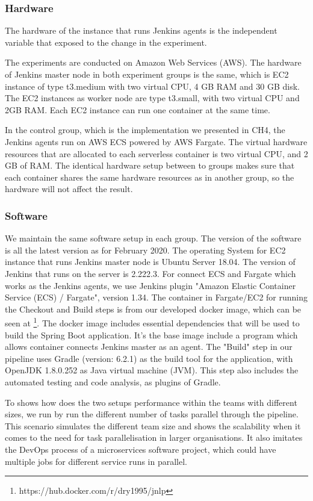 \subsubsection{Hardware}
The hardware of the instance that runs Jenkins agents is the independent variable that exposed to the change in the experiment.
\par
The experiments are conducted on Amazon Web Services (AWS). The hardware of Jenkins master node in both experiment groups is the same, which is EC2 instance of type t3.medium with two virtual CPU, 4 GB RAM and 30 GB disk. The EC2 instances as worker node are type t3.small, with two virtual CPU and 2GB RAM. Each EC2 instance can run one container at the same time.
\par
In the control group, which is the implementation we presented in CH4, the Jenkins agents run on AWS ECS powered by AWS Fargate. The virtual hardware resources that are allocated to each serverless container is two virtual CPU, and 2 GB of RAM. The identical hardware setup between to groups makes sure that each container shares the same hardware resources as in another group, so the hardware will not affect the result.
\subsubsection{Software}
We maintain the same software setup in each group. The version of the software is all the latest version as for February 2020. The operating System for EC2 instance that runs Jenkins master node is Ubuntu Server 18.04. The version of Jenkins that runs on the server is 2.222.3. For connect ECS and Fargate which works as the Jenkins agents, we use Jenkins plugin "Amazon Elastic Container Service (ECS) / Fargate", version 1.34. The container in Fargate/EC2 for running the Checkout and Build steps is from our developed docker image, which can be seen at \footnote{https://hub.docker.com/r/dry1995/jnlp}. The docker image includes essential dependencies that will be used to build the Spring Boot application. It's the base image include a program which allows container connects Jenkins master as an agent. The "Build" step in our pipeline uses Gradle (version: 6.2.1) as the build tool for the application,
with OpenJDK 1.8.0.252 as Java virtual machine (JVM).
This step also includes the automated testing and code analysis, as plugins of Gradle. 
\par
To shows how does the two setups performance within the teams with different sizes, we run by run the different number of tasks parallel through the pipeline. This scenario simulates the different team size and shows the scalability when it comes to the need for task parallelisation in larger organisations. It also imitates the DevOps process of a microservices software project, which could have multiple jobs for different service runs in parallel.

